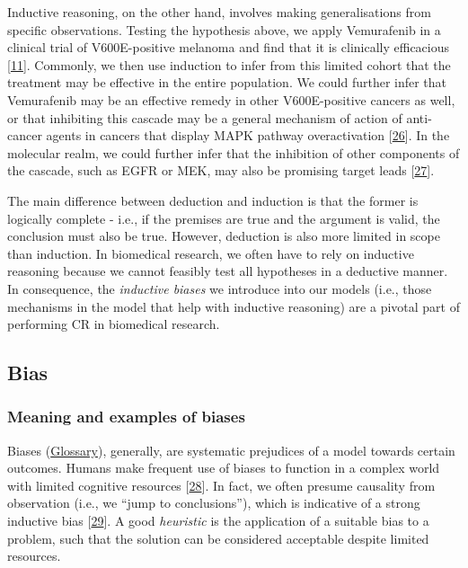 Inductive reasoning, on the other hand, involves making generalisations from specific observations.
Testing the hypothesis above, we apply Vemurafenib in a clinical trial of V600E-positive melanoma and find that it is clinically efficacious {[}\protect\hyperlink{ref-muFRX2ZL}{11}{]}.
Commonly, we then use induction to infer from this limited cohort that the treatment may be effective in the entire population.
We could further infer that Vemurafenib may be an effective remedy in other V600E-positive cancers as well, or that inhibiting this cascade may be a general mechanism of action of anti-cancer agents in cancers that display MAPK pathway overactivation {[}\protect\hyperlink{ref-1BSi2Dk6R}{26}{]}.
In the molecular realm, we could further infer that the inhibition of other components of the cascade, such as EGFR or MEK, may also be promising target leads {[}\protect\hyperlink{ref-ZkFzi3Xl}{27}{]}.

The main difference between deduction and induction is that the former is logically complete - i.e., if the premises are true and the argument is valid, the conclusion must also be true.
However, deduction is also more limited in scope than induction.
In biomedical research, we often have to rely on inductive reasoning because we cannot feasibly test all hypotheses in a deductive manner.
In consequence, the \emph{inductive biases} we introduce into our models (i.e., those mechanisms in the model that help with inductive reasoning) are a pivotal part of performing CR in biomedical research.

\hypertarget{bias}{%
\subsection{Bias}\label{bias}}

\hypertarget{meaning-and-examples-of-biases}{%
\subsubsection{Meaning and examples of biases}\label{meaning-and-examples-of-biases}}

Biases (\protect\hyperlink{bias-machine-learning}{Glossary}), generally, are systematic prejudices of a model towards certain outcomes.
Humans make frequent use of biases to function in a complex world with limited cognitive resources {[}\protect\hyperlink{ref-1DMQH5kzt}{28}{]}.
In fact, we often presume causality from observation (i.e., we ``jump to conclusions''), which is indicative of a strong inductive bias {[}\protect\hyperlink{ref-iWcDZtHu}{29}{]}.
A good \emph{heuristic} is the application of a suitable bias to a problem, such that the solution can be considered acceptable despite limited resources.

